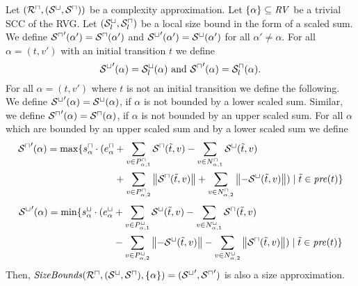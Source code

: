 \begin{theorem}
  Let $({\mathcal{R}^\sqcap}, {({\mathcal{S}^\sqcup}, {\mathcal{S}^\sqcap})})$ be a complexity approximation.
  Let $\lbrace \alpha \rbrace \subseteq \mathit{RV}$ be a trivial SCC of the RVG.
  Let ${({\mathcal{S}^\sqcup_l}, {\mathcal{S}^\sqcap_l})}$ be a local size bound in the form of a scaled sum.
  We define ${\mathcal{S}^\sqcap}'(\alpha') = {\mathcal{S}^\sqcap}(\alpha')$ and ${\mathcal{S}^\sqcup}'(\alpha') = {\mathcal{S}^\sqcup}(\alpha')$ for all $\alpha' \neq \alpha$.
  For all $\alpha = (t, v')$ with an initial transition $t$ we define
  \[ {\mathcal{S}^\sqcup}'(\alpha) = {\mathcal{S}^\sqcup_l}(\alpha) \text{ and } {\mathcal{S}^\sqcap}'(\alpha) = {\mathcal{S}^\sqcap_l}(\alpha). \]
  For all $\alpha = (t, v')$ where $t$ is not an initial transition we define the following.
  We define ${\mathcal{S}^\sqcup}'(\alpha) = {\mathcal{S}^\sqcup}(\alpha)$, if $\alpha$ is not bounded by a lower scaled sum.
  Similar, we define ${\mathcal{S}^\sqcap}'(\alpha) = {\mathcal{S}^\sqcap}(\alpha)$, if $\alpha$ is not bounded by an upper scaled sum.
  For all $\alpha$ which are bounded by an upper scaled sum and by a lower scaled sum we define 
  \begin{equation}
    \begin{split}
      {\mathcal{S}^\sqcap}'(\alpha) = \max \lbrace  s^\sqcap_\alpha \cdot ( e^\sqcap_\alpha & + \sum_{v \in P_{\alpha,1}^\sqcap} {\mathcal{S}^\sqcap}(\tilde{t}, v) - \sum_{v \in N_{\alpha,1}^\sqcap} {\mathcal{S}^\sqcup}(\tilde{t}, v) \\
        & + \sum_{v \in P_{\alpha,2}^\sqcap} \left\Vert{\mathcal{S}^\sqcap}(\tilde{t}, v)\right\Vert + \sum_{v \in N_{\alpha,2}^\sqcap} \left\Vert-{\mathcal{S}^\sqcup}(\tilde{t}, v)\right\Vert ) \mid \tilde{t} \in \mathit{pre}(t) \rbrace
    \end{split}
  \end{equation}
  \begin{equation}
    \begin{split}
      {\mathcal{S}^\sqcup}'(\alpha) = \min \lbrace  s^\sqcup_\alpha \cdot ( e^\sqcup_\alpha & + \sum_{v \in P_{\alpha,1}^\sqcup} {\mathcal{S}^\sqcup}(\tilde{t}, v) - \sum_{v \in N_{\alpha,1}^\sqcup} {\mathcal{S}^\sqcap}(\tilde{t}, v) \\
        & - \sum_{v \in P_{\alpha,2}^\sqcup} \left\Vert-{\mathcal{S}^\sqcup}(\tilde{t}, v)\right\Vert - \sum_{v \in N_{\alpha,2}^\sqcup} \left\Vert{\mathcal{S}^\sqcap}(\tilde{t}, v)\right\Vert ) \mid \tilde{t} \in \mathit{pre}(t) \rbrace
    \end{split}
  \end{equation}
  Then, $\mathit{SizeBounds}({\mathcal{R}^\sqcap}, {({\mathcal{S}^\sqcup}, {\mathcal{S}^\sqcap})}, \lbrace \alpha \rbrace) = ({\mathcal{S}^\sqcup}', {\mathcal{S}^\sqcap}')$ is also a size approximation.
\end{theorem}
